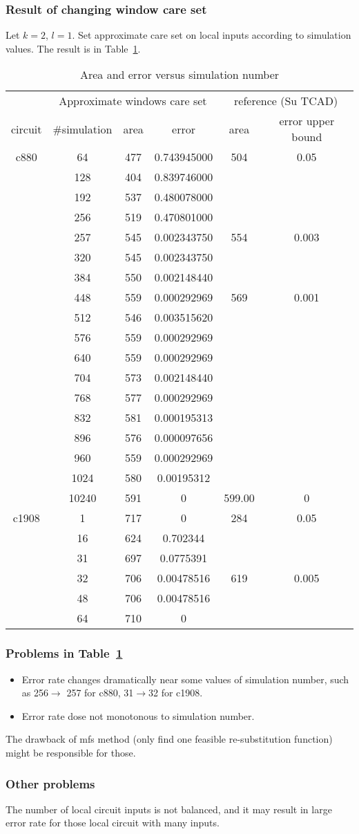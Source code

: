 \documentclass{rpt}
\begin{document}
\subsubsection*{Result of changing window care set}
Let $k=2$, $l=1$.
Set approximate care set on local inputs according to simulation values.
The result is in Table~\ref{tab:res}.
\begin{table}[!h]
\centering
\caption{Area and error versus simulation number}
\begin{tabular}{cccccc}
\toprule
& \multicolumn{3}{c}{Approximate windows care set}&\multicolumn{2}{c}{reference (Su TCAD)}\\
circuit&\#simulation&area&error&area&error upper bound\\
\midrule
c880&64&477&0.743945000&504&0.05\\
&128&404&0.839746000&&\\
&192&537&0.480078000&&\\
&256&519&0.470801000&&\\
&257&545&0.002343750&554&0.003\\
&320&545&0.002343750&&\\
&384&550&0.002148440&&\\
&448&559&0.000292969&569&0.001\\
&512&546&0.003515620&&\\
&576&559&0.000292969&&\\
&640&559&0.000292969&&\\
&704&573&0.002148440&&\\
&768&577&0.000292969&&\\
&832&581&0.000195313&&\\
&896&576&0.000097656&&\\
&960&559&0.000292969&&\\
&1024&580&0.00195312&&\\
&10240&591&0&599.00&0\\
c1908&1&717&0&284&0.05\\
&16&624&0.702344&&\\
&31&697&0.0775391&&\\
&32&706&0.00478516&619&0.005\\
&48&706&0.00478516&&\\
&64&710&0&&\\
\bottomrule
\end{tabular}\label{tab:res}
\end{table}

\subsubsection*{Problems in Table~\ref{tab:res}}
\begin{itemize}
\item Error rate changes dramatically near some values of simulation number,
such as 256$\rightarrow$ 257 for c880, 31$\rightarrow$32 for c1908.
\item Error rate dose not monotonous to simulation number.
\end{itemize}

The drawback of mfs method (only find one feasible re-substitution function) might be responsible for those.

\subsubsection*{Other problems}
The number of local circuit inputs is not balanced,
and it may result in large error rate for those local circuit with many inputs.
\end{document}
